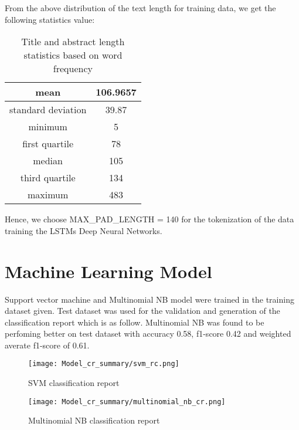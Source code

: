 From the above distribution of the text length for training data, we get the following statistics value:
\begin{table}[H]
    \begin{center}
        \begin{tabular}{ |c|c| }
            \hline
            mean               & 106.9657 \\
            \hline
            standard deviation & 39.87 \\
            \hline
            minimum            & 5       \\
            \hline
            first quartile     & 78      \\
            \hline
            median             & 105      \\
            \hline
            third quartile     & 134      \\
            \hline
            maximum            & 483     \\
            \hline
        \end{tabular}
    \end{center}
    \caption{Title and abstract length statistics based on word frequency}
    \label{table:Title and abstract length statistics based on word frequency}
\end{table}

Hence, we choose MAX\_PAD\_LENGTH = 140 for the tokenization of the data training the LSTMs Deep Neural Networks.


\section{Machine Learning Model}
Support vector machine and Multinomial NB model were trained in the training dataset given. Test dataset was used for the validation and generation of the classification report which is as follow. Multinomial NB was found to be perfoming better on test dataset with accuracy 0.58, f1-score 0.42 and weighted averate f1-score of 0.61.

\begin{figure}[H]
    \centering
    \texttt{[image: Model\_cr\_summary/svm\_rc.png]}
    \caption{SVM classification report}
    \label{fig:SVM classification report}
\end{figure}

\begin{figure}[H]
    \centering
    \texttt{[image: Model\_cr\_summary/multinomial\_nb\_cr.png]}
    \caption{Multinomial NB classification report}
    \label{fig:Multinomial NB classification report}
\end{figure}


